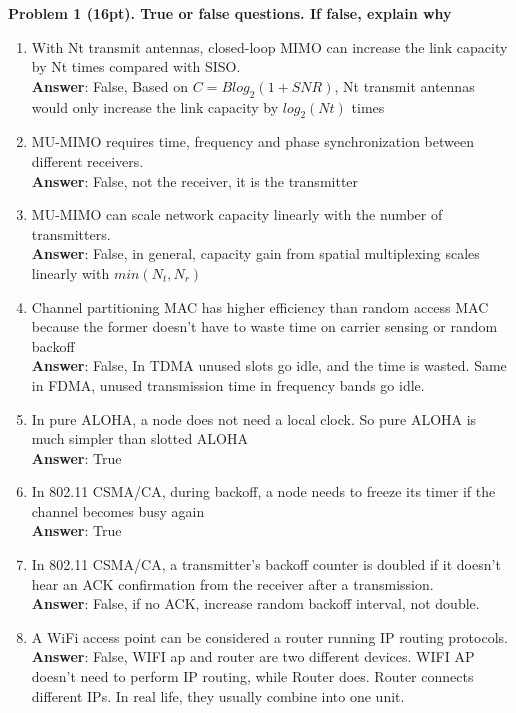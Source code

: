 \documentclass[12pt]{article}
\begin{document}
\noindent \textbf{Problem 1 (16pt). True or false questions. If false, explain why\\}


\begin{enumerate}
\item  With Nt transmit antennas, closed-loop MIMO can increase the link capacity by Nt times
compared with SISO.\\
\textbf{Answer}: False, Based on $C = Blog_2(1+SNR)$, Nt transmit antennas would only increase the link capacity by $log_2(Nt)$ times
\item  MU-MIMO requires time, frequency and phase synchronization between different receivers.\\
\textbf{Answer}: False, not the receiver, it is the transmitter 
\item  MU-MIMO can scale network capacity linearly with the number of transmitters.\\
\textbf{Answer}: False, in general, capacity gain from spatial multiplexing scales linearly with $min(N_t,N_r)$

\item  Channel partitioning MAC has higher efficiency than random access MAC because the
former doesn’t have to waste time on carrier sensing or random backoff\\
\textbf{Answer}: False, In TDMA unused slots go idle, and the time is wasted. Same in FDMA, unused transmission time in frequency bands go idle.
\item  In pure ALOHA, a node does not need a local clock. So pure ALOHA is much simpler than
slotted ALOHA\\
\textbf{Answer}: True

\item  In 802.11 CSMA/CA, during backoff, a node needs to freeze its timer if the channel becomes
busy again\\
\textbf{Answer}: True
\item  In 802.11 CSMA/CA, a transmitter’s backoff counter is doubled if it doesn’t hear an ACK
confirmation from the receiver after a transmission.\\
\textbf{Answer}: False, if no ACK, increase random backoff interval, not double.
\item  A WiFi access point can be considered a router running IP routing protocols. \\
\textbf{Answer}: False, WIFI ap and router are two different devices. WIFI AP doesn't need to perform IP routing, while Router does. Router connects different IPs. In real life, they usually combine into one unit.
\end{enumerate}
	
\end{document}
